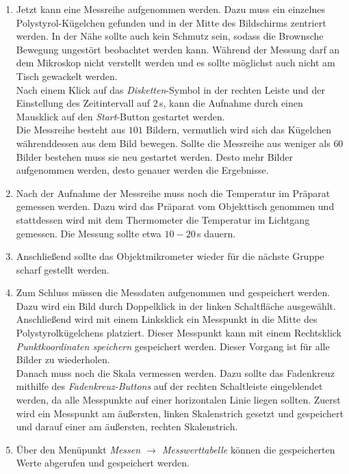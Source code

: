\begin{enumerate}
  \item Jetzt kann eine Messreihe aufgenommen werden. Dazu muss ein einzelnes Polystyrol-Kügelchen gefunden und in der Mitte des Bildschirms zentriert werden. In der Nähe sollte auch kein Schmutz sein, sodass die Brownsche Bewegung ungestört beobachtet werden kann. Während der Messung darf an dem Mikroskop nicht verstellt werden und es sollte möglichst auch nicht am Tisch gewackelt werden.\\
  Nach einem Klick auf das \emph{Disketten}-Symbol in der rechten Leiste und der Einstellung des Zeitintervall  auf $2 \,$s, kann die Aufnahme durch einen Mausklick auf den \emph{Start}-Button gestartet werden.\\
  Die Messreihe besteht aus $101$ Bildern, vermutlich wird sich das Kügelchen währenddessen aus dem Bild bewegen. Sollte die Messreihe aus weniger als $60$ Bilder bestehen muss sie neu gestartet werden. Desto mehr Bilder aufgenommen werden, desto genauer werden die Ergebnisse.

  \item Nach der Aufnahme der Messreihe muss noch die Temperatur im Präparat gemessen werden. Dazu wird das Präparat vom Objekttisch genommen und stattdessen wird mit dem Thermometer die Temperatur im Lichtgang gemessen. Die Messung sollte etwa $10 - 20\,$s dauern.

  \item Anschließend sollte das Objektmikrometer wieder für die nächste Gruppe scharf gestellt werden.

  \item Zum Schluss müssen die Messdaten aufgenommen und gespeichert werden.
  Dazu wird ein Bild durch Doppelklick in der linken Schaltfläche ausgewählt. Anschließend wird mit einem Linksklick ein Messpunkt in die Mitte des Polystyrolkügelchens platziert. Dieser Messpunkt kann mit einem Rechtsklick \emph{Punktkoordinaten speichern} gespeichert werden. Dieser Vorgang ist für alle Bilder zu wiederholen.\\
  Danach muss noch die Skala vermessen werden. Dazu sollte das Fadenkreuz mithilfe des \emph{Fadenkreuz-Buttons} auf der rechten Schaltleiste eingeblendet werden, da alle Messpunkte auf einer horizontalen Linie liegen sollten. Zuerst wird ein Messpunkt am äußersten, linken Skalenstrich gesetzt und gespeichert und darauf einer am äußersten, rechten Skalenstrich.\\

  \item Über den Menüpunkt \emph{Messen $\rightarrow$ Messwerttabelle} können die gespeicherten Werte abgerufen und gespeichert werden.

\end{enumerate}
